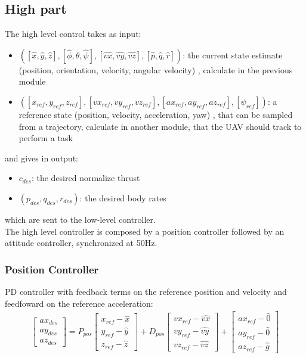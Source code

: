 \subsection{High part}\label{sec:high_control}

The high level control takes as input: 
\begin{itemize}
\item $([\hat{x},\hat{y},\hat{z}],[\hat{\phi},\hat{\theta},\hat{\psi}],[\hat{vx},\hat{vy},\hat{vz}],[\hat{p},\hat{q},\hat{r}])$: the current state estimate (position, orientation, velocity, angular velocity) , calculate in the previous module
\item $([x_{ref},y_{ref},z_{ref}],[vx_{ref},vy_{ref},vz_{ref}],[ax_{ref},ay_{ref},az_{ref}],[\psi_{ref}])$: a reference state (position, velocity, acceleration, yaw) , that can be sampled from a trajectory, calculate in another module, that the UAV should track to perform a task
\end{itemize}
and gives in output:
\begin{itemize}
\item $c_{des}$: the desired normalize thrust 
\item $(p_{des},q_{des},r_{des})$: the desired body rates
\end{itemize}
which are sent to the low-level controller.\\

The high level controller is composed by a position controller followed by an attitude controller, synchronized at 50Hz.

\subsubsection{Position Controller}
PD controller with feedback terms on the reference position and velocity and feedfoward on the reference acceleration:
\begin{align}
\begin{bmatrix}
ax_{des}  \\[10pt]
ay_{des}  \\[10pt]
az_{des}
\end{bmatrix} = P_{pos}
\begin{bmatrix}
x_{ref} - \hat{x} \\[10pt]
y_{ref} - \hat{y}  \\[10pt]
z_{ref} - \hat{z}
\end{bmatrix} + 
D_{pos}
\begin{bmatrix}
vx_{ref} - \hat{vx} \\[10pt]
vy_{ref} - \hat{vy}  \\[10pt]
vz_{ref} - \hat{vz}
\end{bmatrix}
+
\begin{bmatrix}
ax_{ref} - \hat{0} \\[10pt]
ay_{ref} - \hat{0}  \\[10pt]
az_{ref} - \hat{g}
\end{bmatrix}
\label{eq:PDcontroller1}
\end{align}

